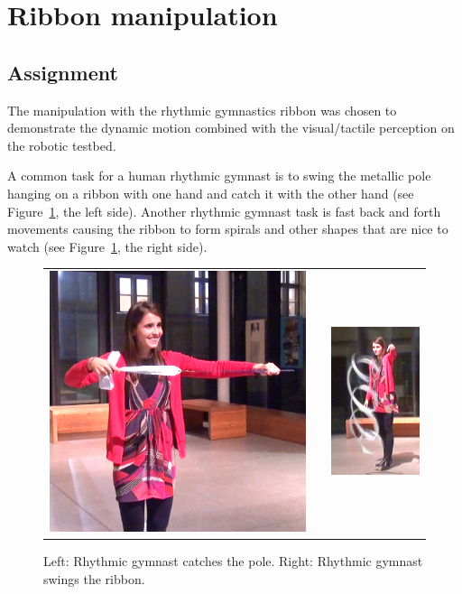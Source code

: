 \graphicspath{{Img/ribbon/}}

\section{Ribbon manipulation}

    \subsection{Assignment}
        The manipulation with the rhythmic gymnastics ribbon was chosen to demonstrate the dynamic motion combined with the visual/tactile perception on the \CloPeMa\/ robotic testbed.

        A common task for a human rhythmic gymnast is to swing the metallic pole hanging on a ribbon with one hand and catch it with the other hand (see Figure~\ref{fig:HumanGymnast}, the left side). Another rhythmic gymnast task is fast back and forth movements causing the ribbon to form spirals and other shapes that are nice to watch (see Figure~\ref{fig:HumanGymnast}, the right side).

        \begin{figure}[h]
            \centering
            \begin{tabular}{ccc}
            \includegraphics[height=0.35\textwidth]{HumanGymnastPendulum.png}
            & &
            \includegraphics[height=0.35\textwidth]{HumanGymnastShapes.png}
            \end{tabular}
            \caption{Left: Rhythmic gymnast catches the pole. Right: Rhythmic gymnast swings the ribbon.}
            \label{fig:HumanGymnast}
        \end{figure}

